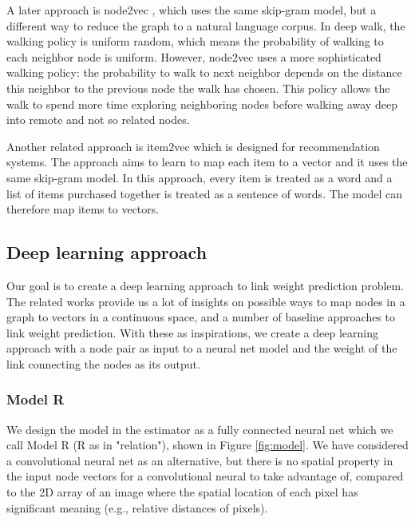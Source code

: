 \documentclass{article}
\begin{document}
A later approach is node2vec \cite{grovernode2vec},
which uses the same skip-gram model, 
but a different way to reduce the graph to a natural language corpus.
In deep walk, the walking policy is uniform random,
which means the probability of walking to each neighbor node is uniform.
However, node2vec uses a more sophisticated walking policy:
the probability to walk to next neighbor depends on
the distance this neighbor to the previous node the walk has chosen.
This policy allows the walk to spend more time exploring neighboring nodes
before walking away deep into remote and not so related nodes.

Another related approach is item2vec \cite{barkan2016item2vec}
which is designed for recommendation systems.
The approach aims to learn to map each item to a vector
and it uses the same skip-gram model.
In this approach, every item is treated as a word and
a list of items purchased together is treated as a sentence of words.
The model can therefore map items to vectors.

\subsection{Deep learning approach}
Our goal is to create a deep learning approach to link weight prediction problem.
The related works provide us a lot of insights on possible ways 
to map nodes in a graph to vectors in a continuous space,
and a number of baseline approaches to link weight prediction.
With these as inspirations,
we create a deep learning approach with a node pair as input to a neural net model
and the weight of the link connecting the nodes as its output.

\subsubsection{Model R}
We design the model in the estimator as a fully connected neural net which we call Model R (R as in "relation"), shown in Figure \ref{fig:model}.
We have considered a convolutional neural net as an alternative,
but there is no spatial property in the input node vectors
for a convolutional neural to take advantage of,
compared to the 2D array of an image where the spatial location of each pixel
has significant meaning (e.g., relative distances of pixels).
\end{document}
